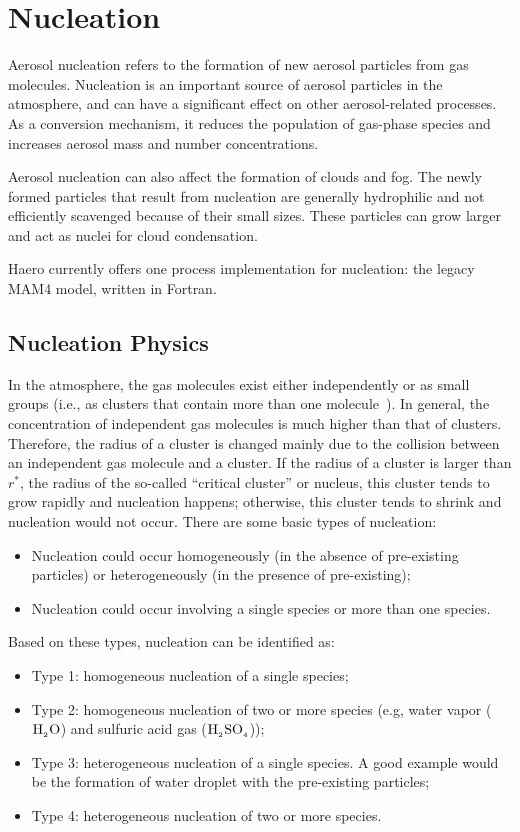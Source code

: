 \section{Nucleation}

Aerosol nucleation refers to the formation of new aerosol particles from gas
molecules. Nucleation is an important source of aerosol particles in the
atmosphere, and can have a significant effect on other aerosol-related
processes. As a conversion mechanism, it reduces the population of gas-phase
species and increases aerosol mass and number concentrations.

Aerosol nucleation can also affect the formation of clouds and fog. The newly
formed particles that result from nucleation are generally hydrophilic and not
efficiently scavenged because of their small sizes. These particles can
grow larger and act as nuclei for cloud condensation.

Haero currently offers one process implementation for nucleation: the legacy
MAM4 model, written in Fortran.

\subsection{Nucleation Physics}

In the atmosphere, the gas molecules exist either independently or as small
groups (i.e., as clusters that contain more than one molecule~\cite{seinfeld-2006-acp}).
In general, the concentration of independent gas molecules is much higher than
that of clusters. Therefore, the radius of a cluster is changed mainly due to the collision
between an independent gas molecule and a cluster. If the radius of a cluster is larger
than $r^*$, the radius of the so-called ``critical cluster'' or nucleus, this cluster tends to
grow rapidly and nucleation happens; otherwise, this cluster tends to shrink and nucleation
would not occur. There are some basic types of nucleation:
\begin{itemize}
\item Nucleation could occur homogeneously (in the absence of pre-existing particles) or
heterogeneously (in the presence of pre-existing);
\item Nucleation could occur involving a single species or more than one species.
\end{itemize}
Based on these types, nucleation can be identified as:
\begin{itemize}
\item Type 1: homogeneous nucleation of a single species;
\item Type 2: homogeneous nucleation of two or more species (e.g, water vapor
($\rm H_{_2}O$) and sulfuric acid gas ($\rm H_{_2}SO_{_4}$));
\item Type 3: heterogeneous nucleation of a single species. A good example would be
the formation of water droplet with the pre-existing particles;
\item Type 4: heterogeneous nucleation of two or more species.
\end{itemize}

